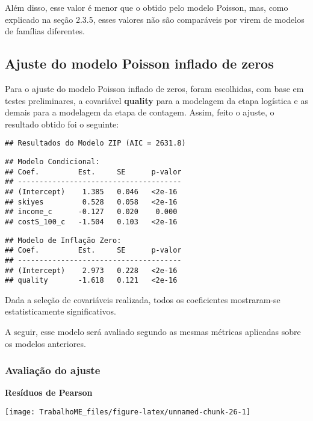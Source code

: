 \documentclass[
  twocolumn]{article}
\begin{document}
Além disso, esse valor é menor que o obtido pelo modelo Poisson, mas,
como explicado na seção 2.3.5, esses valores não são comparáveis por
virem de modelos de famílias diferentes.

\subsection{Ajuste do modelo Poisson inflado de
zeros}\label{ajuste-do-modelo-poisson-inflado-de-zeros}

Para o ajuste do modelo Poisson inflado de zeros, foram escolhidas, com
base em testes preliminares, a covariável \textbf{quality} para a
modelagem da etapa logística e as demais para a modelagem da etapa de
contagem. Assim, feito o ajuste, o resultado obtido foi o seguinte:

\begin{verbatim}
## Resultados do Modelo ZIP (AIC = 2631.8)
\end{verbatim}

\begin{verbatim}
## Modelo Condicional: 
## Coef.         Est.     SE      p-valor
## --------------------------------------
## (Intercept)    1.385   0.046   <2e-16
## skiyes         0.528   0.058   <2e-16
## income_c      -0.127   0.020    0.000
## costS_100_c   -1.504   0.103   <2e-16
\end{verbatim}

\begin{verbatim}
## Modelo de Inflação Zero: 
## Coef.         Est.     SE      p-valor
## --------------------------------------
## (Intercept)    2.973   0.228   <2e-16
## quality       -1.618   0.121   <2e-16
\end{verbatim}

Dada a seleção de covariáveis realizada, todos os coeficientes
mostraram-se estatisticamente significativos.

A seguir, esse modelo será avaliado segundo as mesmas métricas aplicadas
sobre os modelos anteriores.

\subsubsection{Avaliação do ajuste}\label{avaliauxe7uxe3o-do-ajuste}

\textbf{Resíduos de Pearson}

\begin{center}\texttt{[image: TrabalhoME\_files/figure-latex/unnamed-chunk-26-1]} \end{center}
\end{document}
